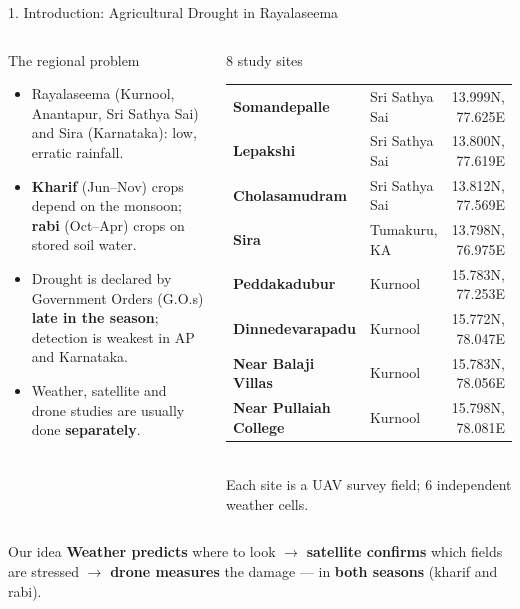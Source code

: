 \documentclass[aspectratio=169,10pt]{beamer}
\begin{document}
\begin{frame}{1. Introduction: Agricultural Drought in Rayalaseema}
\vspace{-2.5mm}
\begin{columns}[T,onlytextwidth]
\begin{card}[equal height group=intro]{The regional problem}
\footnotesize
\begin{itemize}\setlength{\itemsep}{2pt}
\item Rayalaseema (Kurnool, Anantapur, Sri Sathya Sai) and Sira (Karnataka): low, erratic rainfall.
\item \textbf{Kharif} (Jun--Nov) crops depend on the monsoon; \textbf{rabi} (Oct--Apr) crops on stored soil water.
\item Drought is declared by Government Orders (G.O.s) \alert{\textbf{late in the season}}; detection is weakest in AP and Karnataka.
\item Weather, satellite and drone studies are usually done \textbf{separately}.
\end{itemize}
\end{card}
\begin{card}[equal height group=intro]{8 study sites}
\footnotesize
\renewcommand{\arraystretch}{1.2}\setlength{\tabcolsep}{5pt}
\begin{tabular*}{\linewidth}{@{}l@{\extracolsep{\fill}}lr@{}}
\textbf{Somandepalle} & {\color{muted}Sri Sathya Sai} & {\scriptsize 13.999N, 77.625E} \\
\textbf{Lepakshi} & {\color{muted}Sri Sathya Sai} & {\scriptsize 13.800N, 77.619E} \\
\textbf{Cholasamudram} & {\color{muted}Sri Sathya Sai} & {\scriptsize 13.812N, 77.569E} \\
\textbf{Sira} & {\color{muted}Tumakuru, KA} & {\scriptsize 13.798N, 76.975E} \\
\textbf{Peddakadubur} & {\color{muted}Kurnool} & {\scriptsize 15.783N, 77.253E} \\
\textbf{Dinnedevarapadu} & {\color{muted}Kurnool} & {\scriptsize 15.772N, 78.047E} \\
\textbf{Near Balaji Villas} & {\color{muted}Kurnool} & {\scriptsize 15.783N, 78.056E} \\
\textbf{Near Pullaiah College} & {\color{muted}Kurnool} & {\scriptsize 15.798N, 78.081E} \\
\end{tabular*}\\[3pt]
{\scriptsize\color{muted} Each site is a UAV survey field; 6 independent weather cells.}
\end{card}
\end{columns}
\begin{card}{Our idea}
\footnotesize \textbf{Weather predicts} where to look $\rightarrow$ \textbf{satellite confirms} which fields are stressed $\rightarrow$ \textbf{drone measures} the damage --- in \textbf{both seasons} (kharif and rabi).
\end{card}
\end{frame}
\end{document}
